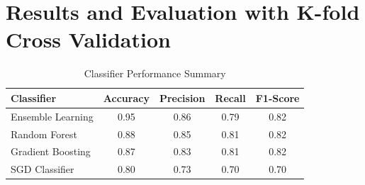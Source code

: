 \section{Results and Evaluation with K-fold Cross Validation}
\begin{table}[!h]
	\centering
	\caption{Classifier Performance Summary}
	\begin{tabular}{lcccc}
		\toprule
		\textbf{Classifier} & \textbf{Accuracy} & \textbf{Precision} & \textbf{Recall} & \textbf{F1-Score} \\
		\midrule
		Ensemble Learning & 0.95 & 0.86 & 0.79 & 0.82 \\
		Random Forest     & 0.88 & 0.85 & 0.81 & 0.82 \\
		Gradient Boosting & 0.87 & 0.83 & 0.81 & 0.82 \\
		SGD Classifier    & 0.80 & 0.73 & 0.70 & 0.70 \\
		\bottomrule
	\end{tabular}
\end{table}


